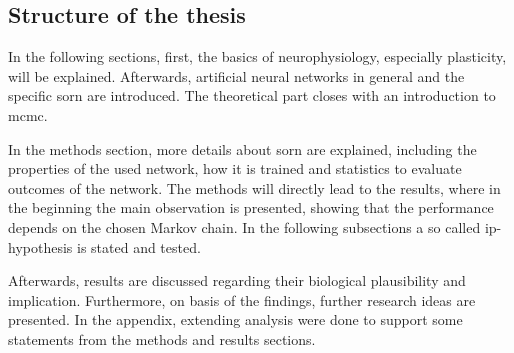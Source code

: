 \subsection{Structure of the thesis}

In the following sections, first, the basics of neurophysiology, especially plasticity, will be explained. Afterwards, artificial neural networks in general and the specific \acf{sorn} are introduced. The theoretical part closes with an introduction to \acf{mcmc}.

In the methods section, more details about \acs{sorn} are explained, including the properties of the used network, how it is trained and statistics to evaluate outcomes of the network. The methods will directly lead to the results, where in the beginning the main observation is presented, showing that the performance depends on the chosen Markov chain. In the following subsections a so called \acs{ip}-hypothesis is stated and tested.

Afterwards, results are discussed regarding their biological plausibility and implication. Furthermore, on basis of the findings, further research ideas are presented. In the appendix, extending analysis were done to support some statements from the methods and results sections.

